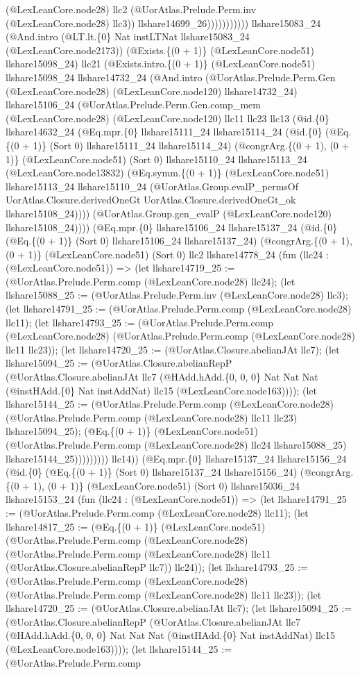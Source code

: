 \documentclass[11pt]{article}
\begin{document}
(@LexLeanCore.node28) llc2 (@UorAtlas.Prelude.Perm.inv (@LexLeanCore.node28) llc3)) llshare14699\_26))))))))))) llshare15083\_24 (@And.intro (@LT.lt.\{0\} Nat instLTNat llshare15083\_24 (@LexLeanCore.node2173)) (@Exists.\{(0 + 1)\} (@LexLeanCore.node51) llshare15098\_24) llc21 (@Exists.intro.\{(0 + 1)\} (@LexLeanCore.node51) llshare15098\_24 llshare14732\_24 (@And.intro (@UorAtlas.Prelude.Perm.Gen (@LexLeanCore.node28) (@LexLeanCore.node120) llshare14732\_24) llshare15106\_24 (@UorAtlas.Prelude.Perm.Gen.comp\_mem (@LexLeanCore.node28) (@LexLeanCore.node120) llc11 llc23 llc13 (@id.\{0\} llshare14632\_24 (@Eq.mpr.\{0\} llshare15111\_24 llshare15114\_24 (@id.\{0\} (@Eq.\{(0 + 1)\} (Sort 0) llshare15111\_24 llshare15114\_24) (@congrArg.\{(0 + 1), (0 + 1)\} (@LexLeanCore.node51) (Sort 0) llshare15110\_24 llshare15113\_24 (@LexLeanCore.node13832) (@Eq.symm.\{(0 + 1)\} (@LexLeanCore.node51) llshare15113\_24 llshare15110\_24 (@UorAtlas.Group.evalP\_permsOf UorAtlas.Closure.derivedOneGt UorAtlas.Closure.derivedOneGt\_ok llshare15108\_24)))) (@UorAtlas.Group.gen\_evalP (@LexLeanCore.node120) llshare15108\_24)))) (@Eq.mpr.\{0\} llshare15106\_24 llshare15137\_24 (@id.\{0\} (@Eq.\{(0 + 1)\} (Sort 0) llshare15106\_24 llshare15137\_24) (@congrArg.\{(0 + 1), (0 + 1)\} (@LexLeanCore.node51) (Sort 0) llc2 llshare14778\_24 (fun (llc24 : (@LexLeanCore.node51)) => (let llshare14719\_25 := (@UorAtlas.Prelude.Perm.comp (@LexLeanCore.node28) llc24); (let llshare15088\_25 := (@UorAtlas.Prelude.Perm.inv (@LexLeanCore.node28) llc3); (let llshare14791\_25 := (@UorAtlas.Prelude.Perm.comp (@LexLeanCore.node28) llc11); (let llshare14793\_25 := (@UorAtlas.Prelude.Perm.comp (@LexLeanCore.node28) (@UorAtlas.Prelude.Perm.comp (@LexLeanCore.node28) llc11 llc23)); (let llshare14720\_25 := (@UorAtlas.Closure.abelianJAt llc7); (let llshare15094\_25 := (@UorAtlas.Closure.abelianRepP (@UorAtlas.Closure.abelianJAt llc7 (@HAdd.hAdd.\{0, 0, 0\} Nat Nat Nat (@instHAdd.\{0\} Nat instAddNat) llc15 (@LexLeanCore.node163)))); (let llshare15144\_25 := (@UorAtlas.Prelude.Perm.comp (@LexLeanCore.node28) (@UorAtlas.Prelude.Perm.comp (@LexLeanCore.node28) llc11 llc23) llshare15094\_25); (@Eq.\{(0 + 1)\} (@LexLeanCore.node51) (@UorAtlas.Prelude.Perm.comp (@LexLeanCore.node28) llc24 llshare15088\_25) llshare15144\_25))))))))) llc14)) (@Eq.mpr.\{0\} llshare15137\_24 llshare15156\_24 (@id.\{0\} (@Eq.\{(0 + 1)\} (Sort 0) llshare15137\_24 llshare15156\_24) (@congrArg.\{(0 + 1), (0 + 1)\} (@LexLeanCore.node51) (Sort 0) llshare15036\_24 llshare15153\_24 (fun (llc24 : (@LexLeanCore.node51)) => (let llshare14791\_25 := (@UorAtlas.Prelude.Perm.comp (@LexLeanCore.node28) llc11); (let llshare14817\_25 := (@Eq.\{(0 + 1)\} (@LexLeanCore.node51) (@UorAtlas.Prelude.Perm.comp (@LexLeanCore.node28) (@UorAtlas.Prelude.Perm.comp (@LexLeanCore.node28) llc11 (@UorAtlas.Closure.abelianRepP llc7)) llc24)); (let llshare14793\_25 := (@UorAtlas.Prelude.Perm.comp (@LexLeanCore.node28) (@UorAtlas.Prelude.Perm.comp (@LexLeanCore.node28) llc11 llc23)); (let llshare14720\_25 := (@UorAtlas.Closure.abelianJAt llc7); (let llshare15094\_25 := (@UorAtlas.Closure.abelianRepP (@UorAtlas.Closure.abelianJAt llc7 (@HAdd.hAdd.\{0, 0, 0\} Nat Nat Nat (@instHAdd.\{0\} Nat instAddNat) llc15 (@LexLeanCore.node163)))); (let llshare15144\_25 := (@UorAtlas.Prelude.Perm.comp 
\end{document}
